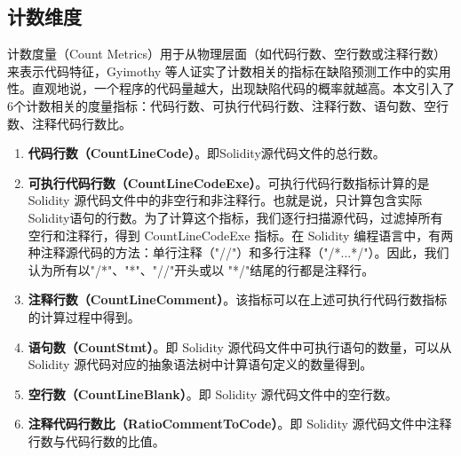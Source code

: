 \subsection{计数维度}
计数度量（Count Metrics）用于从物理层面（如代码行数、空行数或注释行数）来表示代码特征，Gyimothy 等人\cite{gyimothy2005}证实了计数相关的指标在缺陷预测工作中的实用性。直观地说，一个程序的代码量越大，出现缺陷代码的概率就越高。本文引入了6个计数相关的度量指标：代码行数、可执行代码行数、注释行数、语句数、空行数、注释代码行数比。
\begin{enumerate}[label=\Alph*., align=left, leftmargin=*]
    \item \textbf{代码行数（CountLineCode）}。即Solidity源代码文件的总行数。

    \item \textbf{可执行代码行数（CountLineCodeExe）}。可执行代码行数指标计算的是 Solidity 源代码文件中的非空行和非注释行。也就是说，只计算包含实际Solidity语句的行数。为了计算这个指标，我们逐行扫描源代码，过滤掉所有空行和注释行，得到 CountLineCodeExe 指标。在 Solidity 编程语言中，有两种注释源代码的方法：单行注释（"//"）和多行注释（"/*...*/"）。因此，我们认为所有以"/*"、"*"、"//"开头或以 "*/"结尾的行都是注释行。
    
    \item \textbf{注释行数（CountLineComment）}。该指标可以在上述可执行代码行数指标的计算过程中得到。
    
    \item \textbf{语句数（CountStmt）}。即 Solidity 源代码文件中可执行语句的数量，可以从 Solidity 源代码对应的抽象语法树中计算语句定义的数量得到。
    
    \item \textbf{空行数（CountLineBlank）}。即 Solidity 源代码文件中的空行数。
    
    \item \textbf{注释代码行数比（RatioCommentToCode）}。即 Solidity 源代码文件中注释行数与代码行数的比值。
\end{enumerate}
